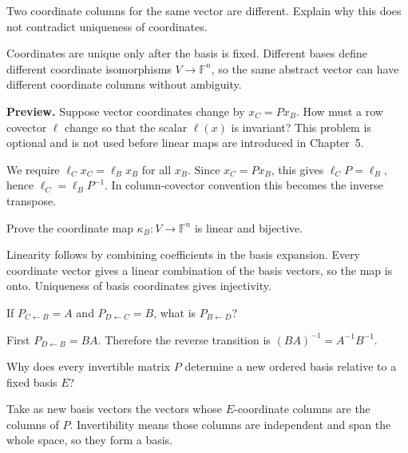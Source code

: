 \begin{problem}\label{prob:i04-problem-07}
Two coordinate columns for the same vector are different. Explain why this does not contradict uniqueness of coordinates.
\end{problem}
\begin{solution}
Coordinates are unique only after the basis is fixed. Different bases define different coordinate isomorphisms $V\to\mathbb F^n$, so the same abstract vector can have different coordinate columns without ambiguity.
\end{solution}

\begin{problem}\label{prob:i04-problem-08}
\textbf{Preview.} Suppose vector coordinates change by $x_C=Px_B$. How must a row covector $\ell$ change so that the scalar $\ell(x)$ is invariant? This problem is optional and is not used before linear maps are introduced in Chapter~5.
\end{problem}
\begin{solution}
We require $\ell_C x_C=\ell_B x_B$ for all $x_B$. Since $x_C=Px_B$, this gives $\ell_C P=\ell_B$, hence $\ell_C=\ell_B P^{-1}$. In column-covector convention this becomes the inverse transpose.
\end{solution}

\begin{problem}\label{prob:i04-problem-09}
Prove the coordinate map $\kappa_B:V\to\mathbb F^n$ is linear and bijective.
\end{problem}
\begin{solution}
Linearity follows by combining coefficients in the basis expansion. Every coordinate vector gives a linear combination of the basis vectors, so the map is onto. Uniqueness of basis coordinates gives injectivity.
\end{solution}

\begin{problem}\label{prob:i04-problem-10}
If $P_{C\leftarrow B}=A$ and $P_{D\leftarrow C}=B$, what is $P_{B\leftarrow D}$?
\end{problem}
\begin{solution}
First $P_{D\leftarrow B}=BA$. Therefore the reverse transition is $(BA)^{-1}=A^{-1}B^{-1}$.
\end{solution}

\begin{problem}\label{prob:i04-problem-11}
Why does every invertible matrix $P$ determine a new ordered basis relative to a fixed basis $E$?
\end{problem}
\begin{solution}
Take as new basis vectors the vectors whose $E$-coordinate columns are the columns of $P$. Invertibility means those columns are independent and span the whole space, so they form a basis.
\end{solution}

